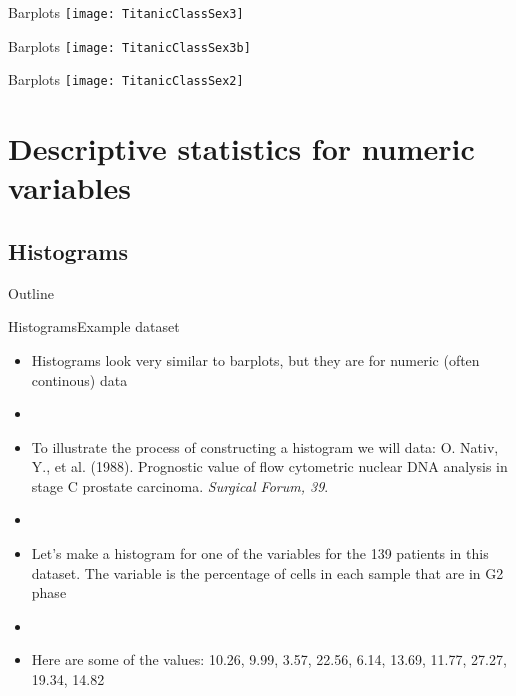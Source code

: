 \documentclass[xcolor=dvipsnames]{beamer}
\begin{document}
\begin{frame}{Barplots}
\texttt{[image: TitanicClassSex3]}
\end{frame}

\begin{frame}{Barplots}
\texttt{[image: TitanicClassSex3b]}
\end{frame}

\begin{frame}{Barplots}
\texttt{[image: TitanicClassSex2]}
\end{frame}

\section{Descriptive statistics for numeric variables}
\subsection{Histograms}
\begin{frame}{Outline}
\tableofcontents[currentsection,subsectionstyle=show/shaded/hide]
\end{frame}

\begin{frame}{Histograms}{Example dataset}
\begin{itemize}
	\item Histograms look very similar to barplots, but they are for numeric (often continous) data \pause
	\item[]
	\item To illustrate the process of constructing a histogram we will data: O. Nativ, Y., et al. (1988). Prognostic value of flow cytometric nuclear DNA analysis in stage C prostate carcinoma. \emph{Surgical Forum, 39}. \pause
	\item[]
	\item Let's make a histogram for one of the variables for the 139 patients in this dataset. The variable is the percentage of cells in each sample that are in G2 phase \pause
	\item[]
	\item Here are some of the values: 10.26, 9.99, 3.57, 22.56, 6.14, 13.69, 11.77, 27.27, 19.34, 14.82 
\end{itemize}
\end{frame}
\end{document}
